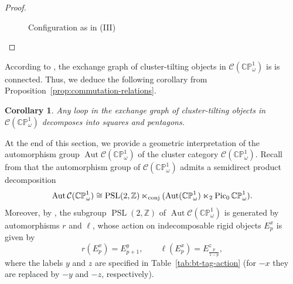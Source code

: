 \documentclass[11pt,a4paper,reqno]{amsart}%
\theoremstyle{plain}
\newtheorem{corollary}[corollary]{Corollary}
\theoremstyle{definition}
\numberwithin{equation}{section}
\numberwithin{equation}{section}
\def\ZZ{\mathbb{Z}}
\newcommand{\Pic}{\operatorname{Pic}\nolimits}
\def\wt{\omega}
\def\Aut{\operatorname{Aut}}
\def\PSL{\operatorname{PSL}}
\def\CPone{\mathbb{CP}^1_{\wt}}
\def\CCP{\mathcal{C}(\CPone)}
\begin{document}
\begin{proof}
\begin{figure}[h]
    \caption{Configuration as in (III)}
    \label{fig:iii}
\end{figure}
\end{proof}
According to  \cite[Proposition~7.10]{FST},  the exchange graph of cluster-tilting objects in $\CCP$ is is connected.   Thus, we  deduce the following corollary    from  Proposition~\ref{prop:commutation-relations}.
\begin{corollary}\label{cor:5.6}
Any loop in the exchange graph of cluster-tilting objects in $\CCP$ decomposes into squares and pentagons. 
\end{corollary}
 

At the end of this section, we provide a geometric interpretation of the automorphism group $\Aut\CCP$ of the cluster category $\CCP$.
Recall from \cite{LM,BKL} that the automorphism group of $\CCP$ admits a semidirect product decomposition
  \[
  \Aut\CCP\cong \PSL(2,\ZZ)\ltimes_{\rm conj}(\Aut(\CPone) \ltimes_2 \Pic_0\CPone). 
  \]  
Moreover, by , the subgroup $\PSL(2,\ZZ)$ of $\Aut\CCP$ is generated by automorphisms $r$ and $\ell$, whose action on indecomposable rigid objects $E_p^x$ is given by
\[
r(E_p^x)=E_{p+1}^y,\qquad
\ell(E_p^x)=E_{\frac{p}{1-p}}^z,
\]
where the labels $y$ and $z$ are specified in Table~\ref{tab:bt-tag-action} (for $-x$ they are replaced by $-y$ and $-z$, respectively).
\end{document}
